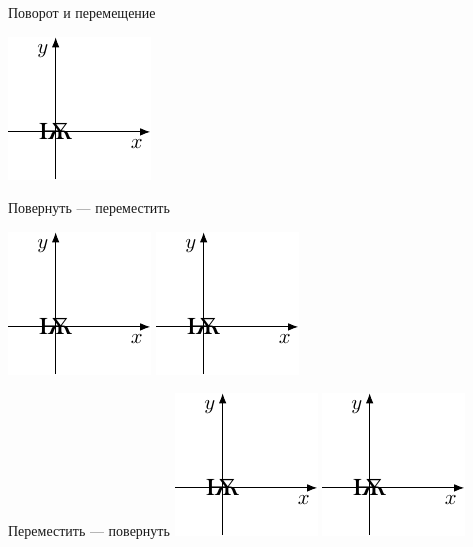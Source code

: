 \documentclass[10pt]{beamer}
\begin{document}
    
    \begin{frame}{Поворот и перемещение}
    	
    	\centering
    	\includegraphics[page=1]{translate4.pdf}
    	{
    		\centering
    		Повернуть --- переместить
    		
    		\includegraphics[page=2]{translate4.pdf}		
    		\includegraphics[page=3]{translate4.pdf}
    	}
    	{
    		\centering
    		Переместить --- повернуть
    		\includegraphics[page=4]{translate4.pdf}		
    		\includegraphics[page=5]{translate4.pdf}
    	}
    	
    \end{frame}
    
\end{document}
